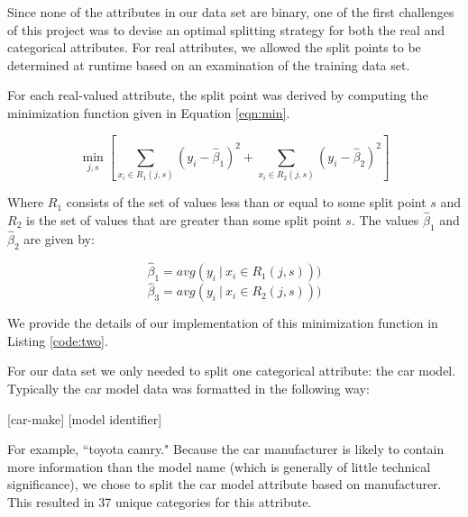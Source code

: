 \documentclass[letterpaper,12pt]{article}
\begin{document}
Since none of the attributes in our data set are binary, one of the first challenges of this project was to devise an optimal splitting strategy for both the real and categorical attributes. For real attributes, we allowed the split points to be determined at runtime based on an examination of the training data set.

For each real-valued attribute, the split point was derived by computing the minimization function given in Equation \ref{eqn:min}.

\begin{equation}
  \min_{j,s} \left[\sum_{x_i \in R_1(j,s)} (y_i - \hat\beta_1)^2 + \sum_{x_i \in R_2(j,s)} (y_i - \hat\beta_2)^2\right]
  \label{eqn:min}
\end{equation} 

Where $R_1$ consists of the set of values less than or equal to some split point $s$ and $R_2$ is the set of values that are greater than some split point $s$. The values $\hat\beta_1$ and $\hat\beta_2$ are given by:

\[
\hat\beta_1 = avg(y_i ~|~ x_i \in R_1(j,s)))
\]
\[
\hat\beta_3 = avg(y_i ~|~ x_i \in R_2(j,s)))
\]

We provide the details of our implementation of this minimization function in Listing \ref{code:two}.

For our data set we only needed to split one categorical attribute: the car model. Typically the car model data was formatted in the following way:

\begin{center}
  [car-make] [model identifier]
\end{center}

For example, ``toyota camry." Because the car manufacturer is likely to contain more information than the model name (which is generally of little technical significance), we chose to split the car model attribute based on manufacturer. This resulted in 37 unique categories for this attribute. 
\end{document}
